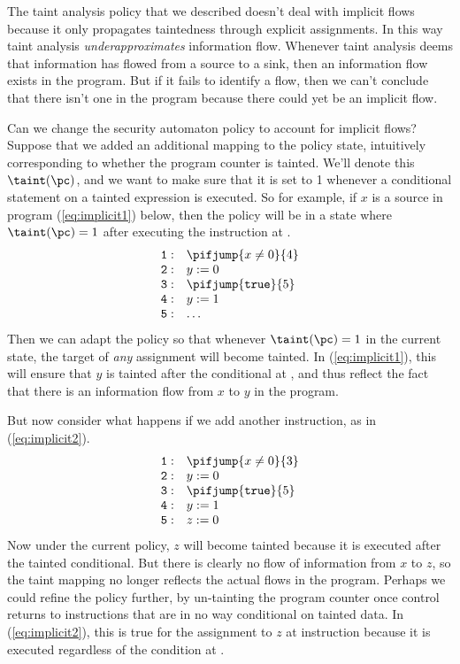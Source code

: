 \documentclass[11pt,twoside]{scrartcl}
\begin{document}
The taint analysis policy that we described doesn't deal with implicit flows because it only propagates taintedness through explicit assignments. In this way taint analysis \emph{underapproximates} information flow. Whenever taint analysis deems that information has flowed from a source to a sink, then an information flow exists in the program. But if it fails to identify a flow, then we can't conclude that there isn't one in the program because there could yet be an implicit flow.

Can we change the security automaton policy to account for implicit flows? Suppose that we added an additional mapping to the policy state, intuitively corresponding to whether the program counter is tainted. We'll denote this $\taint(\pc)$, and we want to make sure that it is set to 1 whenever a conditional statement on a tainted expression is executed. So for example, if $x$ is a source in program (\ref{eq:implicit1}) below, then the policy will be in a state where $\taint(\pc)=1$ after executing the instruction at .
\begin{equation}
\label{eq:implicit1}
\begin{array}{ll}
\mathtt{1:} & \pifjump{x \ne 0}{4} \\
\mathtt{2:} & y := 0 \\
\mathtt{3:} & \pifjump{\mathtt{true}}{5} \\
\mathtt{4:} & y := 1 \\
\mathtt{5:} & \ldots
\end{array}
\end{equation}
Then we can adapt the policy so that whenever $\taint(\pc) = 1$ in the current state, the target of \emph{any} assignment will become tainted. In (\ref{eq:implicit1}), this will ensure that $y$ is tainted after the conditional at , and thus reflect the fact that there is an information flow from $x$ to $y$ in the program.

But now consider what happens if we add another instruction, as in (\ref{eq:implicit2}).
\begin{equation}
\label{eq:implicit2}
\begin{array}{ll}
\mathtt{1:} & \pifjump{x \ne 0}{3} \\
\mathtt{2:} & y := 0 \\
\mathtt{3:} & \pifjump{\mathtt{true}}{5} \\
\mathtt{4:} & y := 1 \\
\mathtt{5:} & z := 0
\end{array}
\end{equation}
Now under the current policy, $z$ will become tainted because it is executed after the tainted conditional. But there is clearly no flow of information from $x$ to $z$, so the taint mapping no longer reflects the actual flows in the program. Perhaps we could refine the policy further, by un-tainting the program counter once control returns to instructions that are in no way conditional on tainted data. In (\ref{eq:implicit2}), this is true for the assignment to $z$ at instruction  because it is executed regardless of the condition at .
\end{document}

